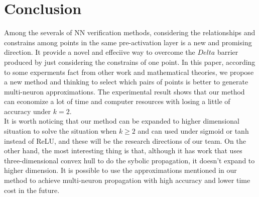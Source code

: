 \documentclass[runningheads]{llncs}
\begin{document}

\section{Conclusion}
Among the severals of NN verification methods, considering the relationships and constrains among points in the same pre-activation layer is a new and promising direction. It provide a novel and effeciive way to overcome the $Delta$ barrier produced by just considering the constrains of one point. In this paper, according to some experments fact from other work and mathematical theories, we propose a new method and thinking to select which pairs of points is better to generate multi-neuron approximations. The experimental result shows that our method can economize a lot of time and computer resources with losing a little of accuracy under $k=2$.\\
It is worth noticing that our method can be expanded to higher dimensional situation to solve the situation when $k\geq 2$ and can used under sigmoid or tanh instead of ReLU, and these will be the research directions of our team. On the other hand, the most interesting thing is that, although it has work that uses three-dimensional convex hull to do the sybolic propagation, it doesn't expand to higher dimension. It is possible to use the approximations mentioned in our method to achieve multi-neuron propagation with high accuracy and lower time cost in the future.
\end{document}
